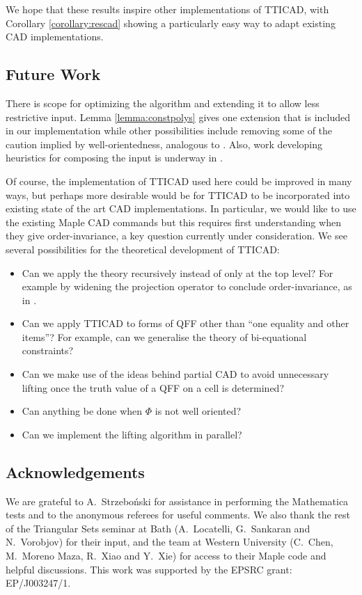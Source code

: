 \documentclass{article}
\begin{document}
We hope that these results inspire other implementations of TTICAD, with Corollary \ref{corollary:rescad} showing a particularly easy way to adapt existing CAD implementations.    

\subsection{Future Work}

There is scope for optimizing the algorithm and extending it to allow less restrictive input.  Lemma \ref{lemma:constpolys} gives one extension that is included in our implementation while other possibilities include removing some of the caution implied by well-orientedness, analogous to \cite{Brown2005}.  Also, work developing heuristics for composing the input is underway in \cite{BDEW13}.  

Of course, the implementation of TTICAD used here could be improved in many ways, but perhaps more desirable would be for TTICAD to be incorporated into existing state of the art CAD implementations.  In particular, we would like to use the existing {\sc Maple} CAD commands \cite{Chenetal2009d} but this requires first understanding when they give order-invariance, a key question currently under consideration.  
We see several possibilities for the theoretical development of TTICAD:
\begin{itemize}[itemsep=-4.5pt,topsep=-10pt]
\item Can we apply the theory recursively instead of only at the top level?  For example by widening the projection operator to 
conclude order-invariance, as in \cite{McCallum2001}.  
\item Can we apply TTICAD to forms of QFF other than ``one equality and other items''?
For example, can we generalise the theory of bi-equational constraints?
\item Can we make use of the ideas behind partial CAD to avoid unnecessary lifting once the truth value of a QFF on a cell is determined? 
\item Can anything be done when $\Phi$ is not well oriented?
\item Can we implement the lifting algorithm in parallel?
\end{itemize}

\subsection*{Acknowledgements}
We are grateful to A.~Strzebo\'nski for assistance in performing the Mathematica tests and to the anonymous referees for useful comments.  We also thank the rest of the Triangular Sets seminar at Bath (A.~Locatelli, G.~Sankaran and N.~Vorobjov) for their input, and the team at Western University (C.~Chen, M.~Moreno Maza, R.~Xiao and Y.~Xie) for access to their {\sc Maple} code and helpful discussions. This work was supported by the EPSRC grant: EP/J003247/1.




\end{document}
